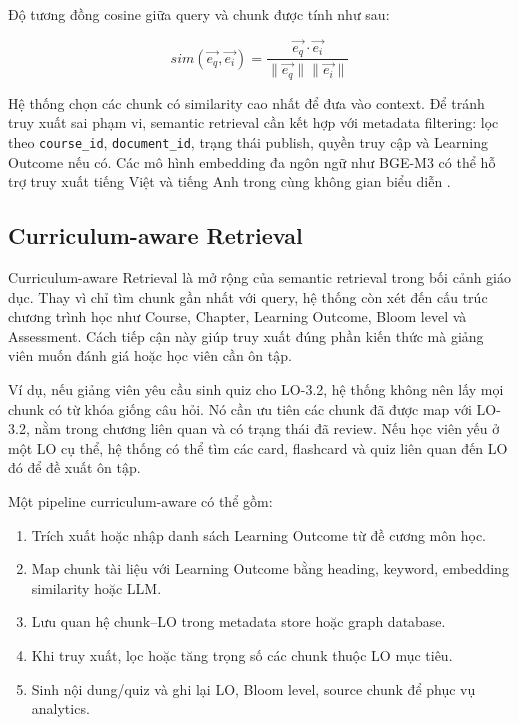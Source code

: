 Độ tương đồng cosine giữa query và chunk được tính như sau:

\[
    sim(\vec{e_q}, \vec{e_i}) =
    \frac{\vec{e_q} \cdot \vec{e_i}}{\|\vec{e_q}\| \|\vec{e_i}\|}
\]

Hệ thống chọn các chunk có similarity cao nhất để đưa vào context. Để tránh
truy xuất sai phạm vi, semantic retrieval cần kết hợp với metadata filtering:
lọc theo \texttt{course\_id}, \texttt{document\_id}, trạng thái publish, quyền
truy cập và Learning Outcome nếu có. Các mô hình embedding đa ngôn ngữ như
BGE-M3 có thể hỗ trợ truy xuất tiếng Việt và tiếng Anh trong cùng không gian
biểu diễn \cite{chen2024bge}.

\subsection{Curriculum-aware Retrieval}
\label{subsec:curriculum-aware-retrieval}

Curriculum-aware Retrieval là mở rộng của semantic retrieval trong bối cảnh
giáo dục. Thay vì chỉ tìm chunk gần nhất với query, hệ thống còn xét đến cấu
trúc chương trình học như Course, Chapter, Learning Outcome, Bloom level và
Assessment. Cách tiếp cận này giúp truy xuất đúng phần kiến thức mà giảng viên
muốn đánh giá hoặc học viên cần ôn tập.

Ví dụ, nếu giảng viên yêu cầu sinh quiz cho LO-3.2, hệ thống không nên lấy mọi
chunk có từ khóa giống câu hỏi. Nó cần ưu tiên các chunk đã được map với
LO-3.2, nằm trong chương liên quan và có trạng thái đã review. Nếu học viên
yếu ở một LO cụ thể, hệ thống có thể tìm các card, flashcard và quiz liên quan
đến LO đó để đề xuất ôn tập.

Một pipeline curriculum-aware có thể gồm:

\begin{enumerate}
    \item Trích xuất hoặc nhập danh sách Learning Outcome từ đề cương môn học.
    \item Map chunk tài liệu với Learning Outcome bằng heading, keyword,
          embedding similarity hoặc LLM.
    \item Lưu quan hệ chunk--LO trong metadata store hoặc graph database.
    \item Khi truy xuất, lọc hoặc tăng trọng số các chunk thuộc LO mục tiêu.
    \item Sinh nội dung/quiz và ghi lại LO, Bloom level, source chunk để phục
          vụ analytics.
\end{enumerate}

